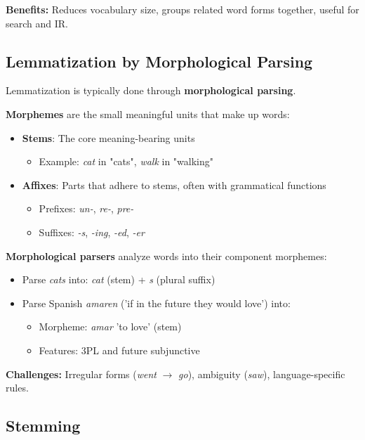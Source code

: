 \documentclass[11pt,a4paper]{article}
\theoremstyle{definition}
\theoremstyle{plain}
\theoremstyle{remark}
\begin{document}
\textbf{Benefits:} Reduces vocabulary size, groups related word forms together, useful for search and IR.

\subsection{Lemmatization by Morphological Parsing}

Lemmatization is typically done through \textbf{morphological parsing}.

\textbf{Morphemes} are the small meaningful units that make up words:
\begin{itemize}
    \item \textbf{Stems}: The core meaning-bearing units
    \begin{itemize}
        \item Example: \textit{cat} in "cats", \textit{walk} in "walking"
    \end{itemize}
    \item \textbf{Affixes}: Parts that adhere to stems, often with grammatical functions
    \begin{itemize}
        \item Prefixes: \textit{un-}, \textit{re-}, \textit{pre-}
        \item Suffixes: \textit{-s}, \textit{-ing}, \textit{-ed}, \textit{-er}
    \end{itemize}
\end{itemize}

\textbf{Morphological parsers} analyze words into their component morphemes:
\begin{itemize}
    \item Parse \textit{cats} into: \textit{cat} (stem) + \textit{s} (plural suffix)
    \item Parse Spanish \textit{amaren} ('if in the future they would love') into:
    \begin{itemize}
        \item Morpheme: \textit{amar} 'to love' (stem)
        \item Features: 3PL and future subjunctive
    \end{itemize}
\end{itemize}

\textbf{Challenges:} Irregular forms (\textit{went} $\rightarrow$ \textit{go}), ambiguity (\textit{saw}), language-specific rules.

\subsection{Stemming}
\end{document}
